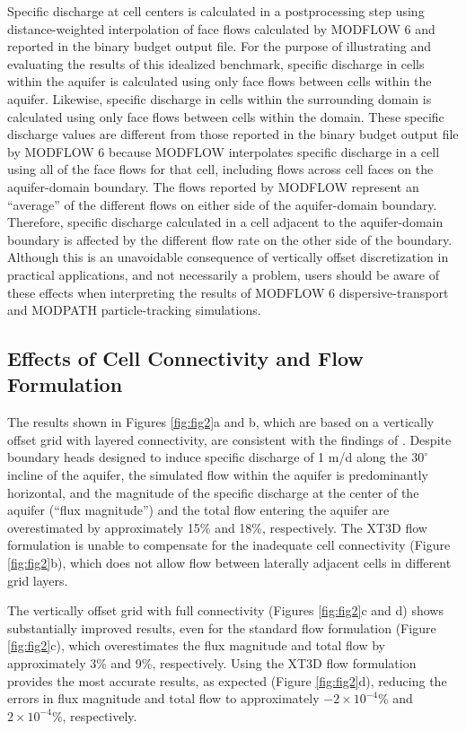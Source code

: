 \documentclass{article}
\begin{document}
Specific discharge at cell centers is calculated in a postprocessing step using distance-weighted interpolation of face flows calculated by MODFLOW 6 and reported in the binary budget output file. For the purpose of illustrating and evaluating the results of this idealized benchmark, specific discharge in cells within the aquifer is calculated using only face flows between cells within the aquifer. Likewise, specific discharge in cells within the surrounding domain is calculated using only face flows between cells within the domain. These specific discharge values are different from those reported in the binary budget output file by MODFLOW 6 because MODFLOW interpolates specific discharge in a cell using all of the face flows for that cell, including flows across cell faces on the aquifer-domain boundary. The flows reported by MODFLOW represent an ``average'' of the different flows on either side of the aquifer-domain boundary. Therefore, specific discharge calculated in a cell adjacent to the aquifer-domain boundary is affected by the different flow rate on the other side of the boundary. Although this is an unavoidable consequence of vertically offset discretization in practical applications, and not necessarily a problem, users should be aware of these effects when interpreting the results of MODFLOW 6 dispersive-transport and MODPATH particle-tracking simulations.

\subsection*{Effects of Cell Connectivity and Flow Formulation}

The results shown in Figures \ref{fig:fig2}a and b, which are based on a vertically offset grid with layered connectivity, are consistent with the findings of \cite{bardot2023}. Despite boundary heads designed to induce specific discharge of 1 m/d along the $30^{\circ}$ incline of the aquifer, the simulated flow within the aquifer is predominantly horizontal, and the magnitude of the specific discharge at the center of the aquifer (``flux magnitude'') and the total flow entering the aquifer are overestimated by approximately 15\% and 18\%, respectively. The XT3D flow formulation is unable to compensate for the inadequate cell connectivity (Figure \ref{fig:fig2}b), which does not allow flow between laterally adjacent cells in different grid layers.

The vertically offset grid with full connectivity (Figures \ref{fig:fig2}c and d) shows substantially improved results, even for the standard flow formulation (Figure \ref{fig:fig2}c), which overestimates the flux magnitude and total flow by approximately 3\% and 9\%, respectively. Using the XT3D flow formulation provides the most accurate results, as expected (Figure \ref{fig:fig2}d), reducing the errors in flux magnitude and total flow to approximately $-2 \times 10^{-4}$\% and $2 \times 10^{-4}$\%, respectively.
\end{document}
